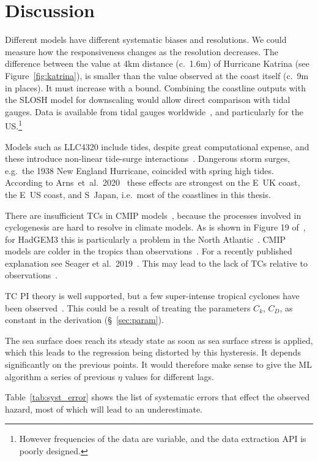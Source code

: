 \section{Discussion}
\label{sec:7_Discussion}

\label{sec:future}

Different models have different systematic biases
and resolutions. We could measure how
the responsiveness changes as the resolution decreases. The difference
between the value at 4km distance (c.~1.6m) of Hurricane Katrina (see Figure~\ref{fig:katrina}),
is smaller than the value observed at the coast itself (c.~9m in places).
It must increase with a bound.
Combining the coastline outputs with the SLOSH model for downscaling
would allow direct comparison with tidal gauges.
Data is available from tidal gauges worldwide~\cite{tadesse2020data, arns2020non},
and particularly for the US.\footnote{
However frequencies of the data are variable,
and the data extraction API is poorly designed.}

Models such as LLC4320 include tides,
 despite great computational expense,
and these introduce non-linear tide-surge interactions~\cite{feng2019characteristics,
arns2020non}.
Dangerous storm surges, e.g.~the 1938 New England
Hurricane, coincided with spring high tides.
According to Arns~et~al.~2020~\cite{arns2020non}
these effects are strongest on the E~UK coast,
the E~US coast, and S~Japan, i.e.~most of the coastlines in
this thesis.

There are insufficient TCs in CMIP models~\cite{camargo2013global},
because the processes involved
in cyclogenesis are hard to resolve in climate models.
As is shown in Figure 19 of~\cite{williams2018met},
 for HadGEM3 this is particularly a problem in the North Atlantic~\cite{tomassini2017interaction}. %
CMIP models are colder in the tropics than observations~\cite{camargo2013global}.
For a recently published explanation see Seager et al.~2019~\cite{seager2019strengthening}.
This may lead to the lack of TCs relative to observations~\cite{tomassini2017interaction}.

TC PI theory is well supported,
but a few super-intense tropical cyclones have been observed~\cite{camargo2019tropical}.
This could be a result of treating the parameters $C_k$, $C_D$, as constant in the derivation (§~\ref{sec:param}).

The sea surface does reach its steady state as soon as sea surface
stress is applied, which this leads
to the regression being distorted by this hysteresis.
It depends significantly on the previous points.
It would therefore make sense to give the ML algorithm
a series of previous $\eta$ values for different lags.


\label{sec:sys-errors}
Table~\ref{tab:syst_error} shows the list of systematic errors that effect the
observed hazard, most of which will lead to an underestimate.


